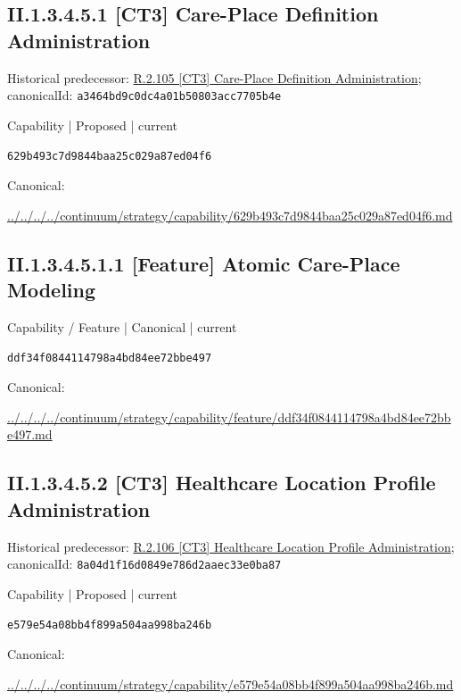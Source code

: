 \documentclass[10pt,a4paper]{article}
\begin{document}
\subsection*{II.1.3.4.5.1 [CT3] Care-Place Definition Administration}
Historical predecessor: \hyperref[element-a3464bd9c0dc4a01b50803acc7705b4e]{R.2.105 [CT3] Care-Place Definition Administration}; canonicalId: \texttt{a3464bd9c0dc4a01b50803acc7705b4e}\par
\label{element-629b493c7d9844baa25c029a87ed04f6}
{\small Capability | Proposed | current}\par
\texttt{629b493c7d9844baa25c029a87ed04f6}\par
Canonical: \par
{\footnotesize\url{../../../../continuum/strategy/capability/629b493c7d9844baa25c029a87ed04f6.md}}\par
\subsection*{II.1.3.4.5.1.1 [Feature] Atomic Care-Place Modeling}
\label{element-ddf34f0844114798a4bd84ee72bbe497}
{\small Capability / Feature | Canonical | current}\par
\texttt{ddf34f0844114798a4bd84ee72bbe497}\par
Canonical: \par
{\footnotesize\url{../../../../continuum/strategy/capability/feature/ddf34f0844114798a4bd84ee72bbe497.md}}\par
\subsection*{II.1.3.4.5.2 [CT3] Healthcare Location Profile Administration}
Historical predecessor: \hyperref[element-8a04d1f16d0849e786d2aaec33e0ba87]{R.2.106 [CT3] Healthcare Location Profile Administration}; canonicalId: \texttt{8a04d1f16d0849e786d2aaec33e0ba87}\par
\label{element-e579e54a08bb4f899a504aa998ba246b}
{\small Capability | Proposed | current}\par
\texttt{e579e54a08bb4f899a504aa998ba246b}\par
Canonical: \par
{\footnotesize\url{../../../../continuum/strategy/capability/e579e54a08bb4f899a504aa998ba246b.md}}\par
\end{document}
